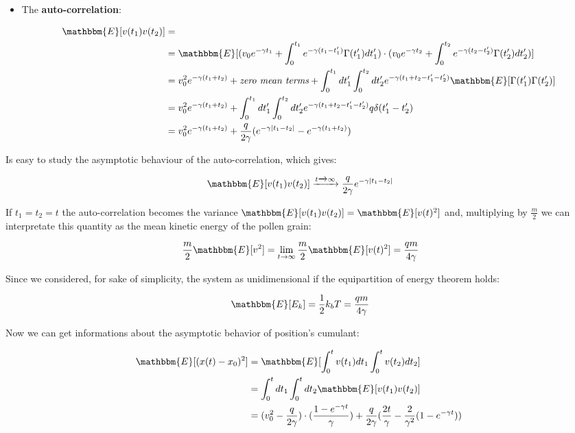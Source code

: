 \documentclass{article}
\begin{document}
\begin{itemize}

\item The \textbf{auto-correlation}:

	\begin{align*} 
	\mathbbm{E}[v(t_1) v(t_2)] &= \\
	&= \mathbbm{E}[ (v_0 e^{-\gamma t_1}+ \int_{0}^{t_1} e^{- \gamma (t_1-t_1')}\Gamma(t_1') dt_1') \cdot (v_0 e^{-\gamma t_2} + \int_{0}^{t_2}e^{- \gamma (t_2-t_2')} \Gamma(t_2') dt_2') ]  \\ 
	&=  v_0^2 e^{-\gamma(t_1 + t_2)} + \textit{zero mean terms} +  \int_{0}^{t_1} dt_1' \int_{0}^{t_2} dt_2' e^{-\gamma(t_1+t_2-t_1'-t_2')} \mathbbm{E}[ \Gamma(t_1') \Gamma(t_2')] \\
	&=  v_0^2 e^{-\gamma(t_1 + t_2)} + \int_{0}^{t_1} dt_1' \int_{0}^{t_2} dt_2' e^{-\gamma(t_1+t_2-t_1'-t_2')} q \delta(t_1'-t_2')  \\
	&=  v_0^2 e^{-\gamma(t_1 + t_2)} + \frac{q}{2\gamma} ( e^{-\gamma|t_1-t_2|} - e^{-\gamma(t_1 + t_2)} ) \\
	\end{align*}

\end{itemize}

Is easy to study the asymptotic behaviour of the auto-correlation, which gives:

\begin{equation}
\mathbbm{E}[v(t_1) v(t_2)] \xrightarrow{t\xrightarrow{} \infty}  \frac{q}{2\gamma} e^{-\gamma|t_1-t_2|}
\end{equation}

If $t_1=t_2=t$ the auto-correlation becomes the variance $\mathbbm{E}[v(t_1) v(t_2)] = \mathbbm{E}[v(t)^2]$ and, multiplying by $\frac{m}{2}$ we can interpretate this quantity as the mean kinetic energy of the pollen grain:

$$ \frac{m}{2} \mathbbm{E}[v^2] = \lim\limits_{t \to \infty} \frac{m}{2} \mathbbm{E}[v(t)^2]  =\frac{qm}{4\gamma}$$

Since we considered, for sake of simplicity, the system as unidimensional if the equipartition of energy theorem holds:

$$ \mathbbm{E}[E_k] = \frac{1}{2}k_b T = \frac{qm}{4\gamma} $$

Now we can get informations about the asymptotic behavior of position's cumulant:


\begin{align*}
\mathbbm{E}[(x(t)-x_0)^2] &= \mathbbm{E}[ \int_{0}^{t} v(t_1) dt_1 \int_{0}^{t} v(t_2) dt_2 ] \\
&= \int_{0}^{t} dt_1 \int_{0}^{t} dt_2  \mathbbm{E}[v(t_1) v(t_2) ] \\
& = (v_0^2 - \frac{q}{2 \gamma}) \cdot ( \frac{1-e^{-\gamma t}}{\gamma}) +  \frac{q}{2 \gamma} ( \frac{2t}{\gamma} - \frac{2}{\gamma^2}(1-e^{-\gamma t}))\
\end{align*}
\end{document}
